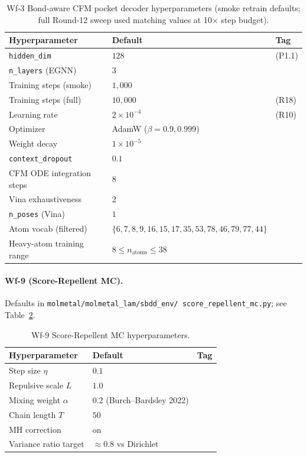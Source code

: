 \begin{table}[h]
  \centering
  \small
  \caption{Wf-3 Bond-aware CFM pocket decoder hyperparameters
  (smoke retrain defaults; full Round-12 sweep used matching
  values at 10$\times$ step budget).}
  \label{tab:wf3-hparams}
  \begin{tabular}{lll}
    \toprule
    \textbf{Hyperparameter} & \textbf{Default} & \textbf{Tag} \\
    \midrule
    \texttt{hidden\_dim} & $128$ & \MEASURED{} (P1.1) \\
    \texttt{n\_layers} (EGNN) & $3$ & \DESIGN{} \\
    Training steps (smoke) & $1{,}000$ & \DESIGN{} \\
    Training steps (full) & $10{,}000$ & \PROJECTED{} (R18) \\
    Learning rate & $2 \times 10^{-4}$ & \MEASURED{} (R10) \\
    Optimizer & AdamW ($\beta = 0.9, 0.999$) & \DESIGN{} \\
    Weight decay & $1 \times 10^{-5}$ & \DESIGN{} \\
    \texttt{context\_dropout} & $0.1$ & \DESIGN{} \\
    CFM ODE integration steps & $8$ & \DESIGN{} \\
    Vina exhaustiveness & $2$ & \DESIGN{} \\
    \texttt{n\_poses} (Vina) & $1$ & \DESIGN{} \\
    Atom vocab (filtered) & $\{6, 7, 8, 9, 16, 15, 17, 35, 53,
                              78, 46, 79, 77, 44\}$ & \MEASURED{} \\
    Heavy-atom training range & $8 \le n_{\mathrm{atoms}} \le 38$
      & \MEASURED{} \\
    \bottomrule
  \end{tabular}
\end{table}

\paragraph{Wf-9 (Score-Repellent MC).}
Defaults in
\texttt{molmetal/molmetal\_lam/sbdd\_env/
score\_repellent\_mc.py}; see Table~\ref{tab:wf9-hparams}.

\begin{table}[h]
  \centering
  \small
  \caption{Wf-9 Score-Repellent MC hyperparameters.}
  \label{tab:wf9-hparams}
  \begin{tabular}{lll}
    \toprule
    \textbf{Hyperparameter} & \textbf{Default} & \textbf{Tag} \\
    \midrule
    Step size $\eta$ & $0.1$ & \DESIGN{} \\
    Repulsive scale $L$ & $1.0$ & \DESIGN{} \\
    Mixing weight $\alpha$ & $0.2$ (Burch--Bardsley 2022)
      & \DESIGN{} \\
    Chain length $T$ & $50$ & \DESIGN{} \\
    MH correction & on & \DESIGN{} \\
    Variance ratio target & $\approx 0.8$ vs Dirichlet & \DESIGN{} \\
    \bottomrule
  \end{tabular}
\end{table}

